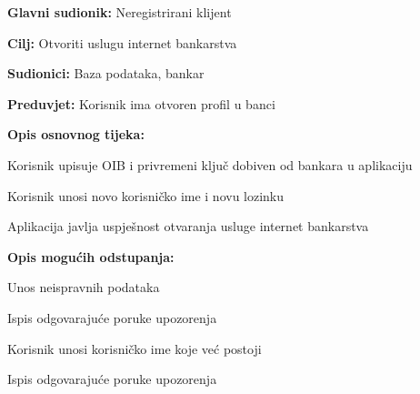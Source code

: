   				\noindent {}
  			\begin{packed_item}
  				
  				\item \textbf{Glavni sudionik: } Neregistrirani klijent
  				\item  \textbf{Cilj:} Otvoriti uslugu internet bankarstva
  				\item  \textbf{Sudionici:} Baza podataka, bankar
  				\item  \textbf{Preduvjet:} Korisnik ima otvoren profil u banci
  				\item  \textbf{Opis osnovnog tijeka:}
  				
  				\item[] \begin{packed_enum}
			
			\item Korisnik upisuje OIB i privremeni ključ dobiven od bankara u aplikaciju
			\item Korisnik unosi novo korisničko ime i novu lozinku
			\item Aplikacija javlja uspješnost otvaranja usluge internet bankarstva
			
		\end{packed_enum}
			
				\item  \textbf{Opis mogućih odstupanja:}
			
			\item[] \begin{packed_item}
				
				\item[1.a] Unos neispravnih podataka
				\item[] \begin{packed_enum}
					\item Ispis odgovarajuće poruke upozorenja
				\end{packed_enum}
				
				\item[2.a] Korisnik unosi korisničko ime koje već postoji
				\item[] \begin{packed_enum}
					\item Ispis odgovarajuće poruke upozorenja
				\end{packed_enum}
			
			\end{packed_item}
		
								
		
	\end{packed_item}		
				
